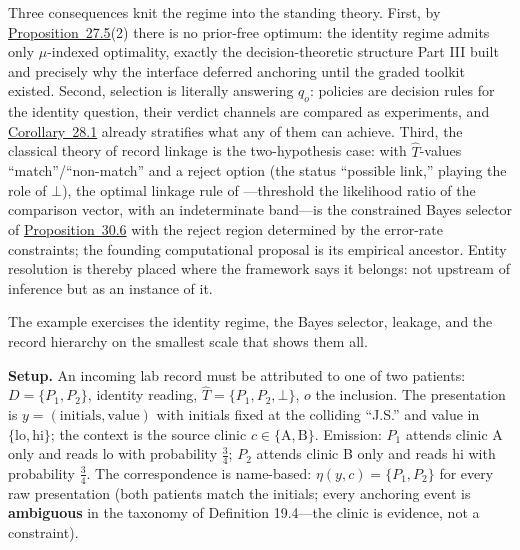 Three consequences knit the regime into the standing theory. First, by \hyperlink{stmt:27.5}{Proposition~27.5}(2) there is no prior-free optimum: the identity regime admits only \(\mu\)-indexed optimality, exactly the decision-theoretic structure Part III built and precisely why the interface deferred anchoring until the graded toolkit existed. Second, selection is literally answering \(q_o\): policies are decision rules for the identity question, their verdict channels are compared as experiments, and \hyperlink{stmt:28.1}{Corollary~28.1} already stratifies what any of them can achieve. Third, the classical theory of record linkage is the two-hypothesis case: with \(\widehat{T}\)-values ``match''/``non-match'' and a reject option (the status ``possible link,'' playing the role of \(\bot\)), the optimal linkage rule of \autocite{fellegi1969}---\hspace{0pt}threshold the likelihood ratio of the comparison vector, with an indeterminate band---\hspace{0pt}is the constrained Bayes selector of \hyperlink{stmt:30.6}{Proposition~30.6} with the reject region determined by the error-rate constraints; the founding computational proposal \autocite{newcombe1959} is its empirical ancestor. Entity resolution is thereby placed where the framework says it belongs: not upstream of inference but as an instance of it.


The example exercises the identity regime, the Bayes selector, leakage, and the record hierarchy on the smallest scale that shows them all.

\textbf{Setup.} An incoming lab record must be attributed to one of two patients: \(D = \{P_1, P_2\}\), identity reading, \(\widehat{T} = \{P_1, P_2, \bot\}\), \(o\) the inclusion. The presentation is \(y = (\text{initials}, \text{value})\) with initials fixed at the colliding ``J.S.'' and value in \(\{\mathrm{lo}, \mathrm{hi}\}\); the context is the source clinic \(c \in \{\mathrm{A}, \mathrm{B}\}\). Emission: \(P_1\) attends clinic A only and reads lo with probability \(\tfrac34\); \(P_2\) attends clinic B only and reads hi with probability \(\tfrac34\). The correspondence is name-based: \(\eta(y, c) = \{P_1, P_2\}\) for every raw presentation (both patients match the initials; every anchoring event is \textbf{ambiguous} in the taxonomy of Definition 19.4---\hspace{0pt}the clinic is evidence, not a constraint).

